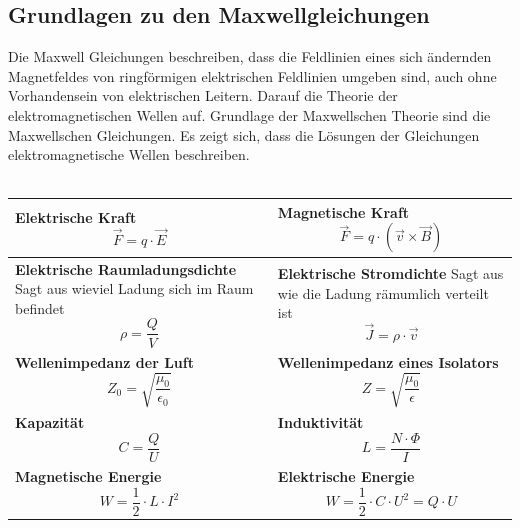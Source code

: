 \subsection{Grundlagen zu den Maxwellgleichungen}
Die Maxwell Gleichungen beschreiben, dass die Feldlinien eines sich ändernden Magnetfeldes von ringförmigen elektrischen Feldlinien umgeben sind, auch ohne Vorhandensein von elektrischen Leitern. Darauf die Theorie der elektromagnetischen Wellen auf. Grundlage der Maxwellschen Theorie sind die Maxwellschen Gleichungen. Es zeigt sich, dass die Lösungen der Gleichungen elektromagnetische Wellen beschreiben.\\
\vspace{0.2cm}\\
\renewcommand{\arraystretch}{1.2}
\begin{tabular}{|p{} |p{}|}
	\hline
	\textbf{Elektrische Kraft}\newline
	\[\vec{F}=q\cdot \vec{E}\]&
	\textbf{Magnetische Kraft}\newline
	\[\vec{F}=q\cdot(\vec{v}\times \vec{B})\]\\
	\hline
	\textbf{Elektrische Raumladungsdichte}\newline
	Sagt aus wieviel Ladung sich im Raum befindet\newline
	\[ \rho  = \frac{Q}{V}\]&
	\textbf{Elektrische Stromdichte}\newline
	Sagt aus wie die Ladung rämumlich verteilt ist\newline
	\[\vec{J}=\rho \cdot \vec{v}\]\\
	\hline
	\textbf{Wellenimpedanz der Luft}\newline
	\[Z_{0}=\sqrt{\frac{\mu_{0}}{\epsilon_{0}}} \]&
	\textbf{Wellenimpedanz eines Isolators}\newline
	\[Z=\sqrt{\frac{\mu_{0}}{\epsilon}} \]\\
	\hline
	\textbf{Kapazität}\newline
	\[C=\frac{Q}{U} \] &
	\textbf{Induktivität}\newline
	\[L=\frac{N\cdot \Phi }{I} \]\\
	\hline
	\textbf{Magnetische Energie}\newline
	\[W= \frac{1}{2}\cdot L \cdot I^{2}\]&
	\textbf{Elektrische Energie}\newline
	\[W= \frac{1}{2}\cdot C \cdot U^{2}= Q\cdot U \]\\
	\hline
\end{tabular}
